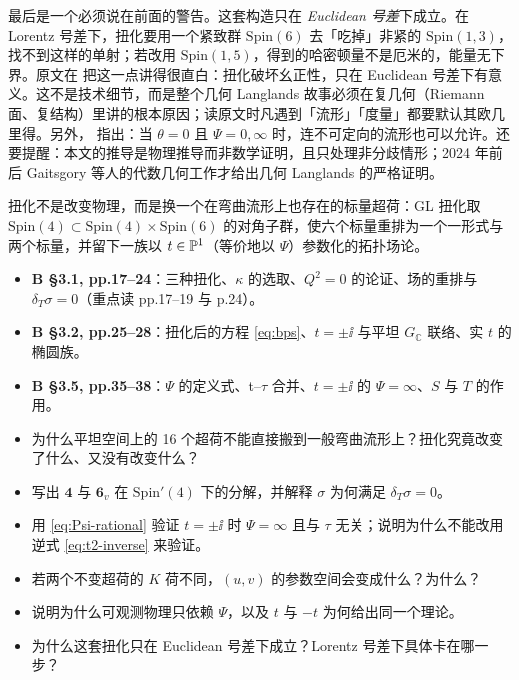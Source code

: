 最后是一个必须说在前面的警告。这套构造只在 \emph{Euclidean 号差}下成立。在 Lorentz 号差下，扭化要用一个紧致群 $\mathrm{Spin}(6)$ 去「吃掉」非紧的 $\mathrm{Spin}(1,3)$，找不到这样的单射；若改用 $\mathrm{Spin}(1,5)$，得到的哈密顿量不是厄米的，能量无下界。原文在  把这一点讲得很直白：扭化破坏幺正性，只在 Euclidean 号差下有意义。这不是技术细节，而是整个几何 Langlands 故事必须在复几何（Riemann 面、复结构）里讲的根本原因；读原文时凡遇到「流形」「度量」都要默认其欧几里得。另外， 指出：当 $\theta=0$ 且 $\Psi=0,\infty$ 时，连不可定向的流形也可以允许。还要提醒：本文的推导是物理推导而非数学证明，且只处理非分歧情形；2024 年前后 Gaitsgory 等人的代数几何工作才给出几何 Langlands 的严格证明。

\begin{keybox}
扭化不是改变物理，而是换一个在弯曲流形上也存在的标量超荷：GL 扭化取 $\mathrm{Spin}(4)\subset\mathrm{Spin}(4)\times\mathrm{Spin}(6)$ 的对角子群，使六个标量重排为一个一形式与两个标量，并留下一族以 $t\in\mathbb{P}^1$（等价地以 $\Psi$）参数化的拓扑场论。
\end{keybox}

\begin{follow}
\begin{itemize}
\item \textbf{B §3.1, pp.17--24}：三种扭化、$\kappa$ 的选取、$Q^2=0$ 的论证、场的重排与 $\delta_T\sigma=0$（重点读 pp.17--19 与 p.24）。
\item \textbf{B §3.2, pp.25--28}：扭化后的方程 \eqref{eq:bps}、$t=\pm\ii$ 与平坦 $G_{\mathbb C}$ 联络、实 $t$ 的椭圆族。
\item \textbf{B §3.5, pp.35--38}：$\Psi$ 的定义式、t--$\tau$ 合并、$t=\pm\ii$ 的 $\Psi=\infty$、$S$ 与 $T$ 的作用。
\end{itemize}
\end{follow}

\begin{checkbox}
\begin{itemize}
\item 为什么平坦空间上的 16 个超荷不能直接搬到一般弯曲流形上？扭化究竟改变了什么、又没有改变什么？
\item 写出 $\mathbf 4$ 与 $\mathbf 6_v$ 在 $\mathrm{Spin}'(4)$ 下的分解，并解释 $\sigma$ 为何满足 $\delta_T\sigma=0$。
\item 用 \eqref{eq:Psi-rational} 验证 $t=\pm\ii$ 时 $\Psi=\infty$ 且与 $\tau$ 无关；说明为什么不能改用逆式 \eqref{eq:t2-inverse} 来验证。
\item 若两个不变超荷的 $K$ 荷不同，$(u,v)$ 的参数空间会变成什么？为什么？
\item 说明为什么可观测物理只依赖 $\Psi$，以及 $t$ 与 $-t$ 为何给出同一个理论。
\item 为什么这套扭化只在 Euclidean 号差下成立？Lorentz 号差下具体卡在哪一步？
\end{itemize}
\end{checkbox}
